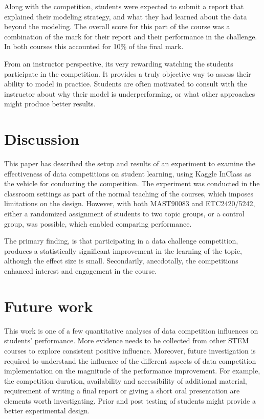 \documentclass[12pt]{article}
\begin{document}
Along with the competition, students were expected to submit a report
that explained their modeling strategy, and what they had learned about
the data beyond the modeling. The overall score for this part of the
course was a combination of the mark for their report and their
performance in the challenge. In both courses this accounted for 10\% of
the final mark.

From an instructor perspective, its very rewarding watching the students
participate in the competition. It provides a truly objective way to
assess their ability to model in practice. Students are often motivated
to consult with the instructor about why their model is underperforming,
or what other approaches might produce better results.

\section{Discussion}\label{discussion}

This paper has described the setup and results of an experiment to
examine the effectiveness of data competitions on student learning,
using Kaggle InClass as the vehicle for conducting the competition. The
experiment was conducted in the classroom settings as part of the normal
teaching of the courses, which imposes limitations on the design.
However, with both MAST90083 and ETC2420/5242, either a randomized
assignment of students to two topic groups, or a control group, was
possible, which enabled comparing performance.

The primary finding, is that participating in a data challenge
competition, produces a statistically significant improvement in the
learning of the topic, although the effect size is small. Secondarily,
anecdotally, the competitions enhanced interest and engagement in the
course.

\section{Future work}\label{future-work}

This work is one of a few quantitative analyses of data competition
influences on students' performance. More evidence needs to be collected
from other STEM courses to explore consistent positive influence.
Moreover, future investigation is required to understand the influence
of the different aspects of data competition implementation on the
magnitude of the performance improvement. For example, the competition
duration, availability and accessibility of additional material,
requirement of writing a final report or giving a short oral
presentation are elements worth investigating. Prior and post testing of
students might provide a better experimental design.
\end{document}
